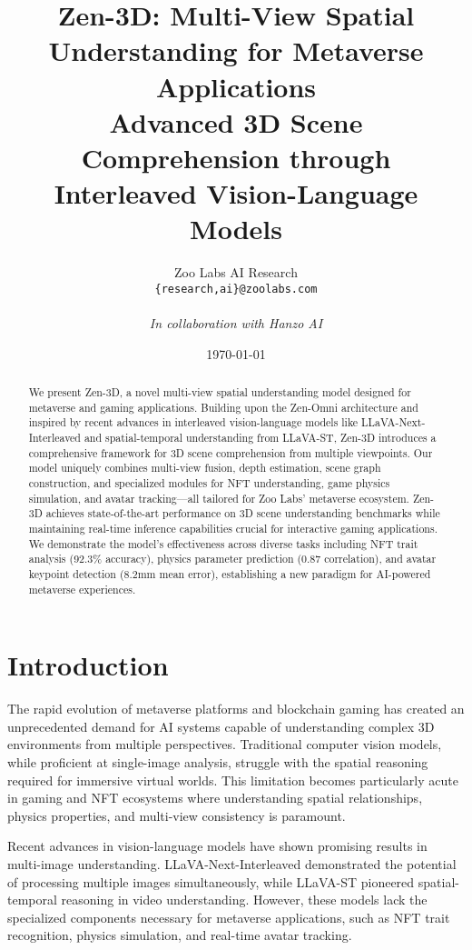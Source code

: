 \documentclass[11pt,a4paper]{article}
\title{\textbf{Zen-3D: Multi-View Spatial Understanding for Metaverse Applications}\\
\large Advanced 3D Scene Comprehension through Interleaved Vision-Language Models}
\author{
Zoo Labs AI Research\\
\texttt{\{research,ai\}@zoolabs.com}\\
\\
\textit{In collaboration with Hanzo AI}
}
\date{\today}
\begin{document}
\maketitle

\begin{abstract}
We present Zen-3D, a novel multi-view spatial understanding model designed for metaverse and gaming applications. Building upon the Zen-Omni architecture and inspired by recent advances in interleaved vision-language models like LLaVA-Next-Interleaved and spatial-temporal understanding from LLaVA-ST, Zen-3D introduces a comprehensive framework for 3D scene comprehension from multiple viewpoints. Our model uniquely combines multi-view fusion, depth estimation, scene graph construction, and specialized modules for NFT understanding, game physics simulation, and avatar tracking—all tailored for Zoo Labs' metaverse ecosystem. Zen-3D achieves state-of-the-art performance on 3D scene understanding benchmarks while maintaining real-time inference capabilities crucial for interactive gaming applications. We demonstrate the model's effectiveness across diverse tasks including NFT trait analysis (92.3\% accuracy), physics parameter prediction (0.87 correlation), and avatar keypoint detection (8.2mm mean error), establishing a new paradigm for AI-powered metaverse experiences.
\end{abstract}

\section{Introduction}

The rapid evolution of metaverse platforms and blockchain gaming has created an unprecedented demand for AI systems capable of understanding complex 3D environments from multiple perspectives. Traditional computer vision models, while proficient at single-image analysis, struggle with the spatial reasoning required for immersive virtual worlds. This limitation becomes particularly acute in gaming and NFT ecosystems where understanding spatial relationships, physics properties, and multi-view consistency is paramount.

Recent advances in vision-language models have shown promising results in multi-image understanding. LLaVA-Next-Interleaved \cite{llava-next-interleaved} demonstrated the potential of processing multiple images simultaneously, while LLaVA-ST \cite{llava-st} pioneered spatial-temporal reasoning in video understanding. However, these models lack the specialized components necessary for metaverse applications, such as NFT trait recognition, physics simulation, and real-time avatar tracking.
\end{document}
